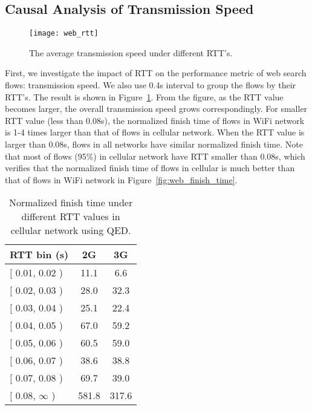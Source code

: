 \subsection{Causal Analysis of Transmission Speed}

\begin{figure}[th]
\centering
\texttt{[image: web\_rtt]}
\caption{The average transmission speed under different RTT's.}
\label{fig:web_rtt}
\end{figure}

First, we investigate the impact of RTT on the performance metric of web search flows: transmission speed. We also use 0.4s interval to group the flows by their RTT's. The result is shown in Figure~\ref{fig:web_rtt}. From the figure, as the RTT value becomes larger, the overall transmission speed grows correspondingly. For smaller RTT value (less than 0.08s), the normalized finish time of flows in WiFi network is 1-4 times larger than that of flows in cellular network. When the RTT value is larger than 0.08s, flows in all networks have similar normalized finish time. Note that most of flows (95\%) in cellular network have RTT smaller than 0.08s, which verifies that the normalized finish time of flows in cellular is much better than that of flows in WiFi network in Figure~\ref{fig:web_finish_time}.

\begin{table}[th]
\centering
\renewcommand{\arraystretch}{1.2}
\caption{Normalized finish time under different RTT values in cellular network using QED.}
\label{tab:web_cellular_rtt_qed}
\begin{tabular}{l|c|c}
\toprule
RTT bin (s) & 2G & 3G \\
\midrule
$[$ 0.01, 0.02 ) & 11.1 & 6.6 \\
\hline
$[$ 0.02, 0.03 ) & 28.0 & 32.3 \\
\hline
$[$ 0.03, 0.04 ) & 25.1 & 22.4 \\
\hline
$[$ 0.04, 0.05 ) & 67.0 & 59.2 \\
\hline
$[$ 0.05, 0.06 ) & 60.5 & 59.0 \\
\hline
$[$ 0.06, 0.07 ) & 38.6 & 38.8 \\
\hline
$[$ 0.07, 0.08 ) & 69.7 & 39.0 \\
\hline
$[$ 0.08, $\infty$ ) & 581.8 & 317.6 \\
\bottomrule
\end{tabular}
\end{table}

